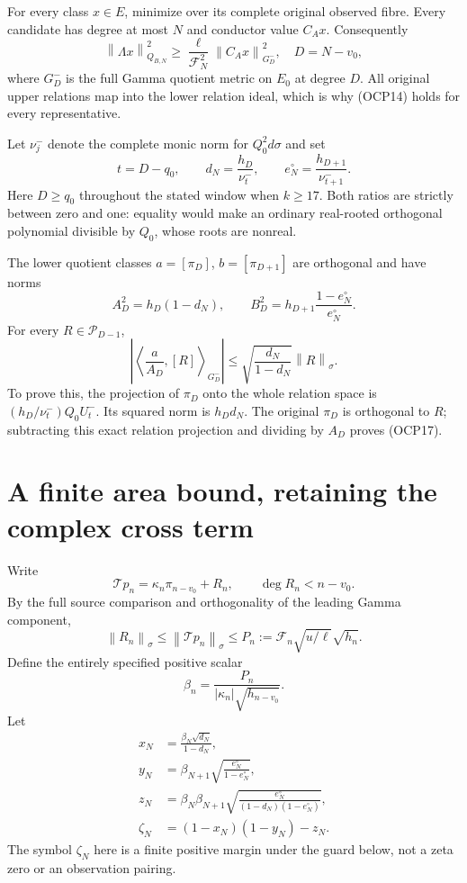 \documentclass[11pt]{article}
\newcommand{\Pp}{\mathcal P}
\newcommand{\norm}[1]{\left\lVert#1\right\rVert}
\begin{document}
For every class $x\in E$, minimize over its complete original observed fibre. Every candidate has degree at most $N$ and conductor value $C_Ax$. Consequently
\[
 \norm{\Lambda x}_{Q_{B,N}}^2
 \ge\frac{\ell}{\mathcal F_N^2}
\norm{C_Ax}_{G^-_D}^2,
 \quad D=N-v_0,
 \tag{OCP14}
\]
where $G^-_D$ is the full Gamma quotient metric on $E_0$ at degree $D$. All original upper relations map into the lower relation ideal, which is why (OCP14) holds for every representative.

Let $\nu_j^-$ denote the complete monic norm for $Q_0^2d\sigma$ and set
\[
 t=D-q_0,\qquad
 d_N=\frac{h_D}{\nu_t^-},\qquad
 e_N^{\circ}=\frac{h_{D+1}}{\nu_{t+1}^-}.
 \tag{OCP15}
\]
Here $D\ge q_0$ throughout the stated window when $k\ge17$. Both ratios are strictly between zero and one: equality would make an ordinary real-rooted orthogonal polynomial divisible by $Q_0$, whose roots are nonreal.

The lower quotient classes $a=[\pi_D]$, $b=[\pi_{D+1}]$ are orthogonal and have norms
\[
 A_D^2=h_D(1-d_N),\qquad
 B_D^2=h_{D+1}\frac{1-e_N^{\circ}}{e_N^{\circ}}.
 \tag{OCP16}
\]
For every $R\in\Pp_{D-1}$,
\[
 \left|\left\langle\frac a{A_D},[R]\right\rangle_{G^-_D}\right|
 \le\sqrt{\frac{d_N}{1-d_N}}\norm R_\sigma.
 \tag{OCP17}
\]
To prove this, the projection of $\pi_D$ onto the whole relation space is
$(h_D/\nu_t^-)Q_0U_t^-$. Its squared norm is $h_Dd_N$. The original $\pi_D$ is orthogonal to $R$; subtracting this exact relation projection and dividing by $A_D$ proves (OCP17).

\section{A finite area bound, retaining the complex cross term}
Write
\[
 \mathcal Tp_n=\kappa_n\pi_{n-v_0}+R_n,
 \qquad \deg R_n<n-v_0.
\]
By the full source comparison and orthogonality of the leading Gamma component,
\[
 \norm{R_n}_\sigma\le\norm{\mathcal Tp_n}_\sigma
 \le P_n:=\mathcal F_n\sqrt{u/\ell}\sqrt{h_n}.
 \tag{OCP18}
\]
Define the entirely specified positive scalar
\[
 \beta_n=\frac{P_n}{|\kappa_n|\sqrt{h_{n-v_0}}}.
\]
Let
\begin{align*}
 x_N&=\frac{\beta_N\sqrt{d_N}}{1-d_N},\\
 y_N&=\beta_{N+1}\sqrt{\frac{e_N^{\circ}}{1-e_N^{\circ}}},\\
 z_N&=\beta_N\beta_{N+1}
 \sqrt{\frac{e_N^{\circ}}{(1-d_N)(1-e_N^{\circ})}},\\
 \zeta_N&=(1-x_N)(1-y_N)-z_N.
\end{align*}
The symbol $\zeta_N$ here is a finite positive margin under the guard below, not a zeta zero or an observation pairing.
\end{document}
